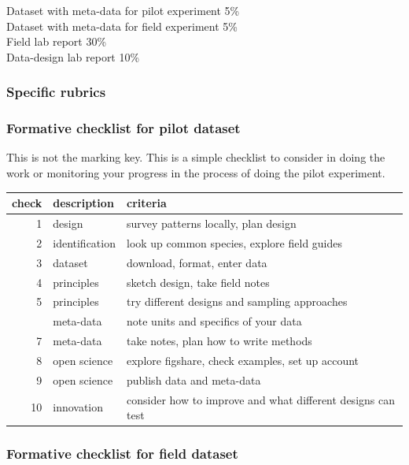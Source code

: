 \documentclass[
]{book}
\begin{document}
Dataset with meta-data for pilot experiment 5\%\\
Dataset with meta-data for field experiment 5\%\\
Field lab report 30\%\\
Data-design lab report 10\%

\hypertarget{specific-rubrics}{%
\subsubsection*{Specific rubrics}\label{specific-rubrics}}

\hypertarget{formative-checklist-for-pilot-dataset}{%
\subsubsection*{Formative checklist for pilot dataset}\label{formative-checklist-for-pilot-dataset}}

This is not the marking key. This is a simple checklist to consider in doing the work or monitoring your progress in the process of doing the pilot experiment.

\begin{tabular}{rll}
\toprule
check & description & criteria\\
\midrule
1 & design & survey patterns locally, plan design\\
2 & identification & look up common species, explore field guides\\
3 & dataset & download, format, enter data\\
4 & principles & sketch design, take field notes\\
5 & principles & try different designs and sampling approaches\\
\addlinespace
6 & meta-data & note units and specifics of your data\\
7 & meta-data & take notes, plan how to write methods\\
8 & open science & explore figshare, check examples, set up account\\
9 & open science & publish data and meta-data\\
10 & innovation & consider how to improve and what different designs can test\\
\bottomrule
\end{tabular}

\hypertarget{formative-checklist-for-field-dataset}{%
\subsubsection*{Formative checklist for field dataset}\label{formative-checklist-for-field-dataset}}
\end{document}
